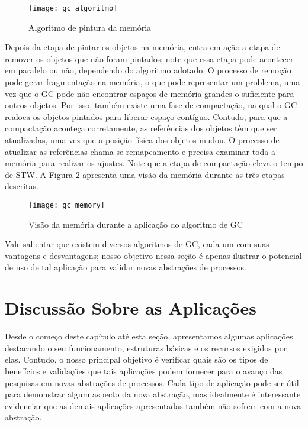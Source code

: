 \begin{figure}[!h]
  \centering
  \texttt{[image: gc\_algoritmo]}
	\caption[Algoritmo de pintura da memória]{Algoritmo de pintura da memória\citep{gc_basics}}
  \label{fig:gc_alg}
\end{figure}

Depois da etapa de pintar os objetos na memória, entra em ação a etapa de
remover os objetos que não foram pintados; note que essa etapa pode acontecer
em paralelo ou não, dependendo do algoritmo adotado. O processo de remoção pode
gerar fragmentação na memória, o que pode representar um problema, uma vez que o
GC pode não encontrar espaços de memória grandes o suficiente para outros
objetos. Por isso, também existe uma fase de compactação, na qual o GC realoca os
objetos pintados para liberar espaço contíguo. Contudo, para que a compactação
aconteça corretamente, as referências dos objetos têm que ser atualizadas, uma
vez que a posição física dos objetos mudou. O processo de atualizar as
referências chama-se remapeamento e precisa examinar toda a memória para
realizar os ajustes. Note que a etapa de compactação eleva o tempo de STW. A
Figura \ref{fig:gc_mem} apresenta uma visão da memória durante as três etapas
descritas.

\begin{figure}[!h]
  \centering
  \texttt{[image: gc\_memory]}
	\caption[Visão da memória durante a aplicação do algoritmo de GC]{Visão da memória durante a aplicação do algoritmo de GC\citep{gc_basics}}
  \label{fig:gc_mem}
\end{figure}

Vale salientar que existem diversos algoritmos de GC, cada um com suas
vantagens e desvantagens; nosso objetivo nessa seção é apenas ilustrar o
potencial de uso de tal aplicação para validar novas abstrações de processos.

\section{Discussão Sobre as Aplicações}
\label{sec:disc_app}


Desde o começo deste capítulo até esta seção, apresentamos algumas aplicações
destacando o seu funcionamento, estruturas básicas e os recursos exigidos por
elas. Contudo, o nosso principal objetivo é verificar quais são os tipos de benefícios
e validações que tais aplicações podem fornecer para o avanço das pesquisas em
novas abstrações de processos. Cada tipo de aplicação pode ser útil para
demonstrar algum aspecto da nova abstração, mas idealmente é interessante
evidenciar que as demais aplicações apresentadas também não sofrem com a nova
abstração.

